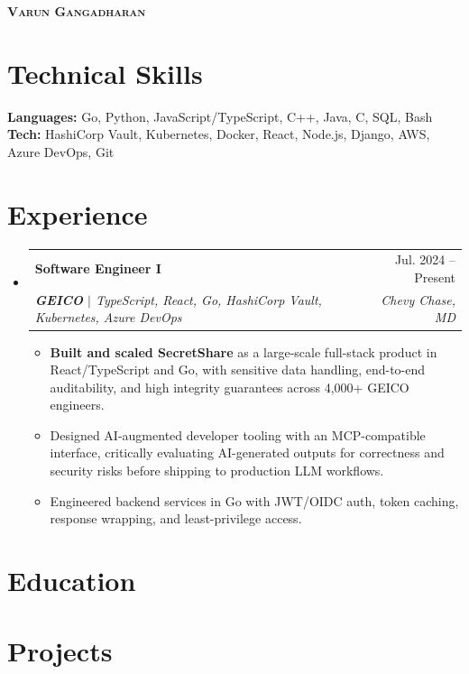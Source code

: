 \documentclass[letterpaper,11pt]{article}
\makeatletter
\newcommand{\resumeItem}[1]{\item\small{{#1 \vspace{-2pt}}}}
\newcommand{\resumeSubheading}[4]{\vspace{-2pt}\item\begin{tabular*}{0.97\textwidth}[t]{l@{\extracolsep{\fill}}r}\textbf{#1} & #2 \\ \textit{\small#3} & \textit{\small #4} \\ \end{tabular*}\vspace{-7pt}}
\newcommand{\resumeSubHeadingListStart}{\begin{itemize}[leftmargin=0.15in, label={}]}
\newcommand{\resumeSubHeadingListEnd}{\end{itemize}}
\newcommand{\resumeItemListStart}{\begin{itemize}}
\newcommand{\resumeItemListEnd}{\end{itemize}\vspace{-5pt}}
\makeatother
\begin{document}
\begin{center}\textbf{\Huge \scshape Varun Gangadharan}\end{center}

\section{Technical Skills}
\begin{itemize}[leftmargin=0.10in, label={}, topsep=2pt, itemsep=0pt]
\small{\item{
\textbf{Languages:} Go, Python, JavaScript/TypeScript, C++, Java, C, SQL, Bash \\
\textbf{Tech:} HashiCorp Vault, Kubernetes, Docker, React, Node.js, Django, AWS, Azure DevOps, Git
}}
\end{itemize}

\section{Experience}
\resumeSubHeadingListStart
\resumeSubheading
{Software Engineer I}{Jul. 2024 -- Present}
{\textbf{GEICO} $|$ TypeScript, React, Go, HashiCorp Vault, Kubernetes, Azure DevOps}{Chevy Chase, MD}
\resumeItemListStart
\resumeItem{\textbf{Built and scaled SecretShare} as a large-scale full-stack product in React/TypeScript and Go, with sensitive data handling, end-to-end auditability, and high integrity guarantees across 4,000+ GEICO engineers.}
\resumeItem{Designed AI-augmented developer tooling with an MCP-compatible interface, critically evaluating AI-generated outputs for correctness and security risks before shipping to production LLM workflows.}
\resumeItem{Engineered backend services in Go with JWT/OIDC auth, token caching, response wrapping, and least-privilege access.}
\resumeItemListEnd
\resumeSubHeadingListEnd

\section{Education}
\section{Projects}
\end{document}
